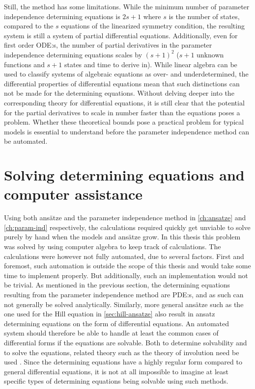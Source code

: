 Still, the method has some limitations.
While the minimum number of parameter independence determining equations is \(2s+1\) where \(s\) is the number of states, compared to the \(s\) equations of the linearized symmetry condition, the resulting system is still a system of partial differential equations.
Additionally, even for first order ODE:s, the number of partial derivatives in the parameter independence determining equations scales by \((s + 1)^2\) (\(s + 1\) unknown functions and \(s + 1\) states and time to derive in).
While linear algebra can be used to classify systems of algebraic equations as over- and underdetermined, the differential properties of differential equations mean that such distinctions can not be made for the determining equations.
Without delving deeper into the corresponding theory for differential equations, it is still clear that the potential for the partial derivatives to scale in number faster than the equations poses a problem.
Whether these theoretical bounds pose a practical problem for typical models is essential to understand before the parameter independence method can be automated.

\section{Solving determining equations and computer assistance}

Using both ansätze and the parameter independence method in \cref{ch:ansatze} and \cref{ch:param-ind} respectively, the calculations required quickly get unviable to solve purely by hand when the models and ansätze grow.
In this thesis this problem was solved by using computer algebra to keep track of calculations.
The calculations were however not fully automated, due to several factors.
First and foremost, such automation is outside the scope of this thesis and would take some time to implement properly.
But additionally, such an implementation would not be trivial.
As mentioned in the previous section, the determining equations resulting from the parameter independence method are PDE:s, and as such can not generally be solved analytically.
Similarly, more general ansätze such as the one used for the Hill equation in \cref{sec:hill-ansatze} also result in ansatz determining equations on the form of differential equations.
An automated system should therefore be able to handle at least the common cases of differential forms if the equations are solvable.
Both to determine solvability and to solve the equations, related theory such as the theory of involution need be used \cite{seiler2009involution}.
Since the determining equations have a highly regular form compared to general differential equations, it is not at all impossible to imagine at least specific types of determining equations being solvable using such methods.


